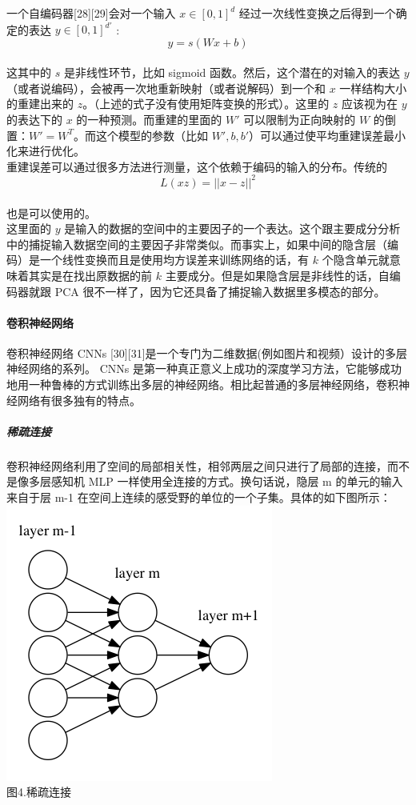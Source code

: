 一个自编码器{[}28{]}{[}29{]}会对一个输入 \(x∈[0, 1]^{d}\)
经过一次线性变换之后得到一个确定的表达 \(y∈[0,1]^{d′}\)
:\\\[y = s(Wx + b)\]\\这其中的 \(s\) 是非线性环节，比如 sigmoid
函数。然后，这个潜在的对输入的表达 \(y\)
（或者说编码），会被再一次地重新映射（或者说解码）到一个和 \(x\)
一样结构大小的重建出来的
\(z\)。（上述的式子没有使用矩阵变换的形式）。这里的 \(z\) 应该视为在
\(y\) 的表达下的 \(x\) 的一种预测。而重建的里面的 \(W'\)
可以限制为正向映射的 \(W\) 的倒置：\(W'=W^T\)。而这个模型的参数（比如
\(W',b,b'\)）可以通过使平均重建误差最小化来进行优化。\\重建误差可以通过很多方法进行测量，这个依赖于编码的输入的分布。传统的\\\[L(xz) = ||x-z||^2\]\\也是可以使用的。\\这里面的
\(y\)
是输入的数据的空间中的主要因子的一个表达。这个跟主要成分分析中的捕捉输入数据空间的主要因子非常类似。而事实上，如果中间的隐含层（编码）是一个线性变换而且是使用均方误差来训练网络的话，有
\(k\) 个隐含单元就意味着其实是在找出原数据的前 \(k\)
主要成分。但是如果隐含层是非线性的话，自编码器就跟 PCA
很不一样了，因为它还具备了捕捉输入数据里多模态的部分。

\paragraph{卷积神经网络}\label{ux5377ux79efux795eux7ecfux7f51ux7edc}

卷积神经网络 CNNs
{[}30{]}{[}31{]}是一个专门为二维数据(例如图片和视频）设计的多层神经网络的系列。
CNNs
是第一种真正意义上成功的深度学习方法，它能够成功地用一种鲁棒的方式训练出多层的神经网络。相比起普通的多层神经网络，卷积神经网络有很多独有的特点。

\subparagraph{稀疏连接}\label{ux7a00ux758fux8fdeux63a5}

卷积神经网络利用了空间的局部相关性，相邻两层之间只进行了局部的连接，而不是像多层感知机
MLP 一样使用全连接的方式。换句话说，隐层 m 的单元的输入来自于层 m-1
在空间上连续的感受野的单位的一个子集。具体的如下图所示：\\\includegraphics{picture/sparse-connectivity.png}\\图4.稀疏连接


